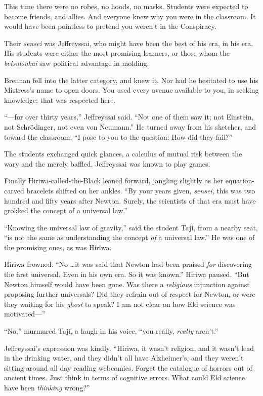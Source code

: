 
{
 This time there were no robes, no hoods, no masks. Students were
expected to become friends, and allies. And everyone knew why you were
in the classroom. It would have been pointless to pretend you
weren't in the Conspiracy. }

{
 Their \textit{sensei} was Jeffreyssai, who might have been the
best of his era, in his era. His students were either the most
promising learners, or those whom the \textit{beisutsukai} saw
political advantage in molding.}

{
 Brennan fell into the latter category, and knew it. Nor had he
hesitated to use his Mistress's name to open doors. You
used every avenue available to you, in seeking knowledge; that was
respected here.}

{
 ``---for over thirty years,''
Jeffreyssai said. ``Not one of them saw it; not
Einstein, not Schrödinger, not even von Neumann.'' He
turned away from his sketcher, and toward the classroom.
``I pose to you to the question: How did they
fail?''}

{
 The students exchanged quick glances, a calculus of mutual risk
between the wary and the merely baffled. Jeffreyssai was known to play
games.}

{
 Finally Hiriwa-called-the-Black leaned forward, jangling slightly
as her equation-carved bracelets shifted on her ankles.
``By your years given, \textit{sensei}, this was two
hundred and fifty years after Newton. Surely, the scientists of that
era must have grokked the concept of a universal
law.''}

{
 ``Knowing the universal law of
gravity,'' said the student Taji, from a nearby seat,
``is not the same as understanding the concept
\textit{of} a universal law.'' He was one of the
promising ones, as was Hiriwa.}

{
 Hiriwa frowned. ``No \ldots it was said that
Newton had been praised \textit{for} discovering the first universal.
Even in his own era. So it was known.'' Hiriwa
paused. ``But Newton himself would have been gone. Was
there a \textit{religious} injunction against proposing further
universals? Did they refrain out of respect for Newton, or were they
waiting for his \textit{ghost} to speak? I am not clear on how Eld
science was motivated---''}

{
 ``No,'' murmured Taji, a laugh
in his voice, ``you really, \textit{really}
aren't.''}

{
 Jeffreyssai's expression was kindly.
``Hiriwa, it wasn't religion, and it
wasn't lead in the drinking water, and they
didn't all have Alzheimer's, and they
weren't sitting around all day reading webcomics.
Forget the catalogue of horrors out of ancient times. Just think in
terms of cognitive errors. What could Eld science have been
\textit{thinking} wrong?''}

